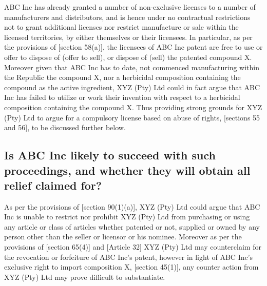 \documentclass[11pt]{article}
\begin{document}
ABC Inc has already granted a number of non-exclusive licenses to a number of manufacturers and distributors, and is hence under
no contractual restrictions not to grant additional licenses nor restrict manufacture or sale within the licensed territories, by
either themselves or their licensees. In particular, as per the provisions of [section 58(a)]\cite{rsa78_patents_act}, the licensees
of ABC Inc patent are free to use or offer to dispose of (offer to sell), or dispose of (sell) the patented compound X. Moreover
given that ABC Inc has to date, not commenced manufacturing within the Republic the compound X, nor a herbicidal composition
containing the compound as the active ingredient, XYZ (Pty) Ltd could in fact argue that ABC Inc has failed to utilize or work
their invention with respect to a herbicidal composition containing the compound X. Thus providing strong grounds for XYZ (Pty)
Ltd to argue for a compulsory license based on abuse of rights, [sections 55 and 56]\cite{rsa78_patents_act}, to be discussed
further below.
\subsection{Is ABC Inc likely to succeed with such proceedings, and whether they will obtain all relief claimed for?}
\label{sec:orgd58e3f4}
As per the provisions of [section 90(1)(a)]\cite{rsa78_patents_act}, XYZ (Pty) Ltd could argue that ABC Inc is unable to restrict nor
prohibit XYZ (Pty) Ltd from purchasing or using any article or class of articles whether patented or not, supplied or owned by any
person other than the seller or licensor or his nominee. Moreover as per the provisions of [section 65(4)]\cite{rsa78_patents_act}
and [Article 32]\cite{wto17_trips} XYZ (Pty) Ltd may counterclaim for the revocation or forfeiture of ABC Inc's patent, however in
light of ABC Inc's exclusive right to import composition X, [section 45(1)]\cite{rsa78_patents_act}, any counter action from XYZ
(Pty) Ltd may prove difficult to substantiate.\\
\end{document}
